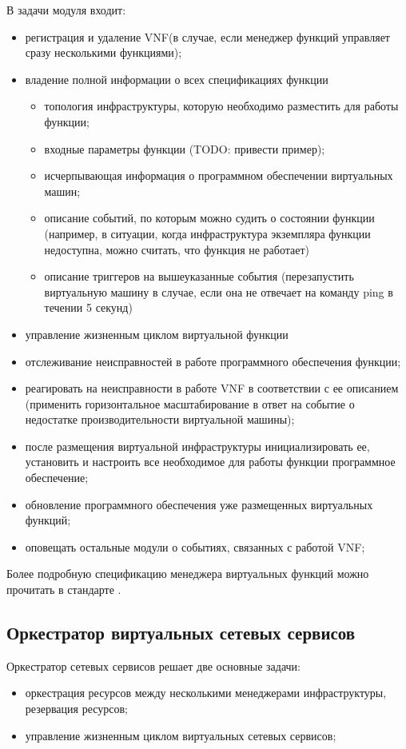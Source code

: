 \documentclass[oneside,final,14pt,a4paper]{extreport}
\begin{document}
В задачи модуля входит:

\begin{itemize}
	\item регистрация и удаление VNF(в случае, если менеджер функций управляет сразу несколькими функциями);
	\item владение полной информации о всех спецификациях функции
	\begin{itemize}
		\item топология инфраструктуры, которую необходимо разместить для работы функции;
		\item входные параметры функции (TODO: привести пример);
		\item исчерпывающая информация о программном обеспечении виртуальных машин;
		\item описание событий, по которым можно судить о состоянии функции (например, в ситуации, когда инфраструктура экземпляра функции недоступна, можно считать, что функция не работает)
		\item описание триггеров на вышеуказанные события (перезапустить виртуальную машину в случае, если она не отвечает на команду ping в течении 5 секунд)
	\end{itemize}
	\item управление жизненным циклом виртуальной функции
	\item отслеживание неисправностей в работе программного обеспечения функции;
	\item реагировать на неисправности в работе VNF в соответствии с ее описанием (применить горизонтальное масштабирование в ответ на событие о недостатке производительности виртуальной машины);
	\item после размещения виртуальной инфраструктуры инициализировать ее, установить и настроить все необходимое для работы функции программное обеспечение;
	\item обновление программного обеспечения уже размещенных виртуальных функций;
	\item оповещать остальные модули о событиях, связанных с работой VNF;
\end{itemize}

Более подробную спецификацию менеджера виртуальных функций можно прочитать в стандарте \cite{nfv-mano-official-2016-04}.

\subsection{Оркестратор виртуальных сетевых сервисов}
Оркестратор сетевых сервисов решает две основные задачи:
\begin{itemize}
	\item оркестрация ресурсов между несколькими менеджерами инфраструктуры, резервация ресурсов;
	\item управление жизненным циклом виртуальных сетевых сервисов;
\end{itemize}
\end{document}
